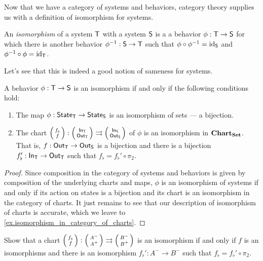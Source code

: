 \documentclass[DynamicalBook]{subfiles}
\begin{document}
Now that we have a category of systems and behaviors, category theory supplies
us with a definition of isomorphism for systems. 
\begin{definition}\label{def.isomorphism_of_systems_discrete}
  An \emph{isomorphism} of a system $\mathsf{T}$ with a system $\mathsf{S}$ is a
  a behavior $\phi : \mathsf{T} \to \mathsf{S}$ for which there is another behavior
  $\phi^{-1} : \mathsf{S} \to \mathsf{T}$ such that $\phi \circ \phi ^{-1} =
  \mathrm{id}_{\mathsf{S}}$ and $\phi ^{-1} \circ \phi = \mathrm{id}_{\mathsf{T}}$.
\end{definition}

Let's see that this is indeed a good notion of sameness for systems.
\begin{proposition}\label{prop.isomorphism_of_systems_discrete}
  A behavior $\phi : \mathsf{T} \to \mathsf{S}$ is an isomorphism if and only if the
  following conditions hold:
\begin{enumerate}
  \item The map $\phi : \mathsf{State}_{\mathsf{T}} \to \mathsf{State}_{\mathsf{S}}$ is an isomorphism of sets --- a
    bijection.
  \item The chart $\lens{f_{\flat}}{f} : \lens{\In{T}}{\Out{T}}
    \rightrightarrows \lens{\In{S}}{\Out{S}}$ of $\phi$ is an isomorphism in
    $\textbf{Chart}_{\textbf{Set}}$. That is, $f : \mathsf{Out}_{\mathsf{T}} \to \mathsf{Out}_{\mathsf{S}}$ is a bijection
    and there is a bijection $f_{\flat}' : \mathsf{In}_{\mathsf{T}} \to \mathsf{Out}_{\mathsf{T}}$ such that
    $f_{\flat} = f_{\flat}' \circ \pi_2$.
\end{enumerate}
\end{proposition}
\begin{proof}
  Since composition in the category of systems and behaviors is given by
  composition of the underlying charts and maps, $\phi$ is an isomorphism of
  systems if and only if its action on states is a bijection and its chart is an
  isomorphism in the category of charts. It just remains to see that our
  description of isomorphism of charts is accurate, which we leave to \cref{ex.isomorphism_in_category_of_charts}.
\end{proof}

\begin{exercise}\label{ex.isomorphism_in_category_of_charts}
  Show that a chart $\lens{f_{\flat}}{f} : \lens{A^-}{A^+}
    \rightrightarrows \lens{B^-}{B^+}$ is an isomorphism if and only if $f$ is
    an isomorphisms and there is an isomorphism $f_{\flat}' : A^- \to B^-$ such
    that $f_{\flat} = f_{\flat}' \circ \pi_2$. 
\end{exercise}
\end{document}
